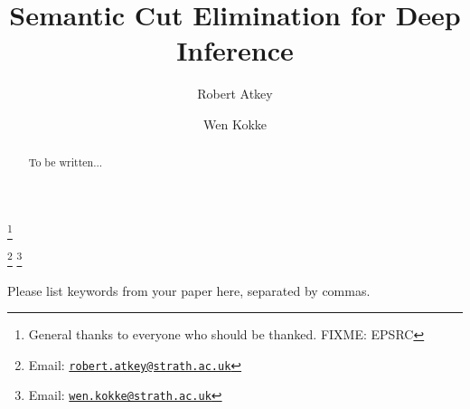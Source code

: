 \documentclass[twoside,11pt]{entics}
\begin{document}
\begin{frontmatter}
  \title{Semantic Cut Elimination for Deep Inference}
  \thanks[ALL]{General thanks to everyone who should be thanked. FIXME: EPSRC}
  \author{Robert Atkey}
  \author{Wen Kokke}
  \address[msp]{%
    Mathematically Structured Programming\\
    Computer and Information Sciences\\
    University of Strathclyde\\
    Glasgow, Scotland, UK}
  \thanks[bobemail]%
  {Email: \href{robert.atkey@strath.ac.uk}%
    {\texttt{\normalshape robert.atkey@strath.ac.uk}}}
  \thanks[wenemail]%
  {Email: \href{wen.kokke@strath.ac.uk}%
    {\texttt{\normalshape wen.kokke@strath.ac.uk}}}
  \begin{abstract}
    To be written...
  \end{abstract}
  \begin{keyword}
    Please list keywords from your paper here, separated by commas.
  \end{keyword}
\end{frontmatter}








\appendix





\end{document}

